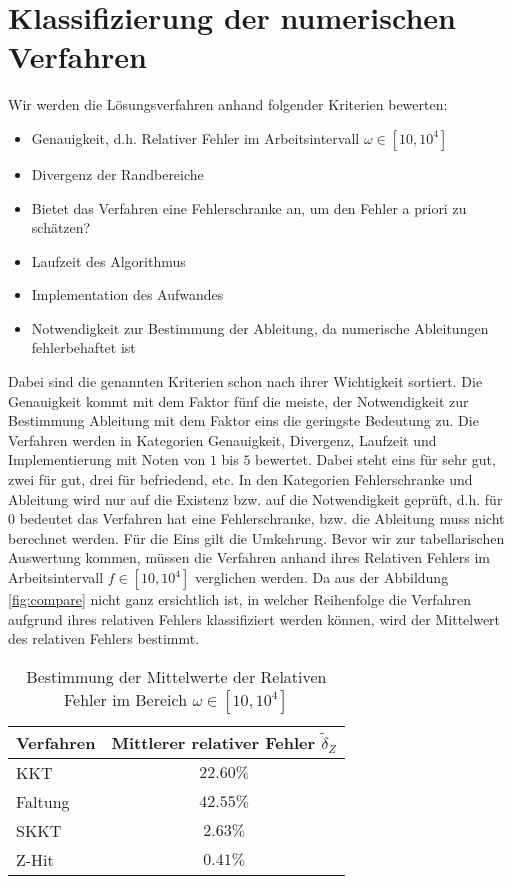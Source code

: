 \section{Klassifizierung der numerischen Verfahren}
Wir werden die Lösungsverfahren anhand folgender Kriterien bewerten:
\begin{itemize}
\item Genauigkeit, d.h. Relativer Fehler im Arbeitsintervall $\omega \in [10, 10^4]$
\item Divergenz der Randbereiche
\item Bietet das Verfahren eine Fehlerschranke an, um den Fehler a priori zu schätzen?
\item Laufzeit des Algorithmus 
\item Implementation des Aufwandes
\item Notwendigkeit zur Bestimmung der Ableitung, da numerische Ableitungen fehlerbehaftet ist
\end{itemize}
Dabei sind die genannten Kriterien schon nach ihrer Wichtigkeit sortiert. Die Genauigkeit kommt mit dem Faktor fünf die meiste, der Notwendigkeit zur Bestimmung Ableitung mit dem Faktor eins die geringste Bedeutung zu. Die Verfahren werden in Kategorien Genauigkeit, Divergenz, Laufzeit und Implementierung mit Noten von $1$ bis $5$ bewertet. Dabei steht eins für sehr gut, zwei für gut, drei für befriedend, etc. In den Kategorien Fehlerschranke und Ableitung wird nur auf die Existenz bzw. auf die Notwendigkeit geprüft, d.h. für $0$ bedeutet das Verfahren hat eine Fehlerschranke, bzw. die Ableitung muss nicht berechnet werden. Für die Eins gilt die Umkehrung. 
Bevor wir zur tabellarischen Auswertung kommen, müssen die Verfahren anhand ihres Relativen Fehlers im Arbeitsintervall $f \in [10, 10^4]$ verglichen werden. Da aus der Abbildung \ref{fig:compare} nicht ganz ersichtlich ist, in welcher Reihenfolge die Verfahren aufgrund ihres relativen Fehlers klassifiziert werden können, wird der Mittelwert des relativen Fehlers bestimmt. 
\begin{table}[h]
\centering
\begin{tabular}{|l|c|}
\hline 
Verfahren & Mittlerer relativer Fehler $\tilde{\delta}_{Z}$  \\ 
\hline 
KKT & $22.60\%$ \\ 
\hline 
Faltung &  $42.55\%$\\ 
\hline 
SKKT & $2.63\%$ \\ 
\hline 
Z-Hit & $0.41\%$ \\ 
\hline 
\end{tabular}
\caption{Bestimmung der Mittelwerte der Relativen Fehler im Bereich $\omega \in [10, 10^4]$}
\end{table}
